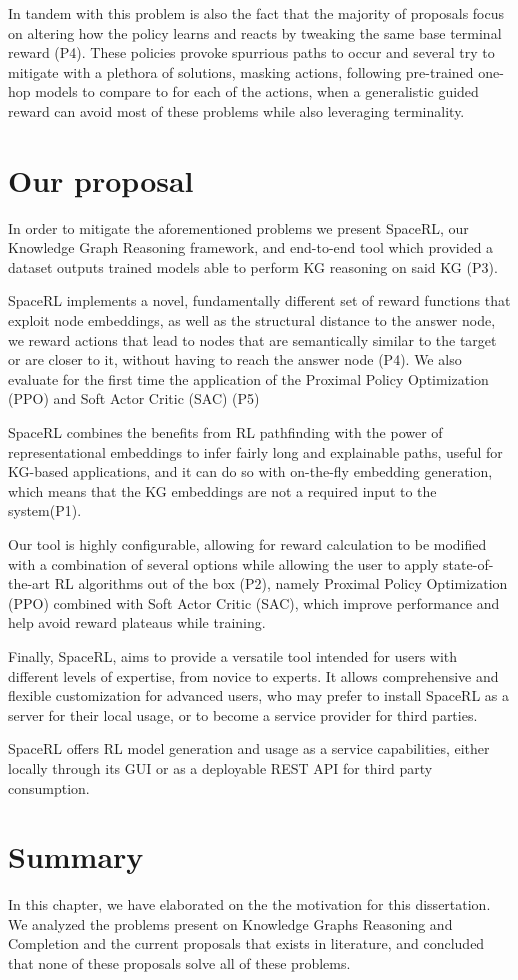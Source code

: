 In tandem with this problem is also the fact that the majority of proposals focus on altering how the policy learns and reacts by tweaking the same base terminal reward (P4). These policies provoke spurrious paths to occur and several \cite{} try to mitigate with a plethora of solutions, masking actions, following pre-trained one-hop models to compare to for each of the actions, when a generalistic guided reward can avoid most of these problems while also leveraging terminality.

\section{Our proposal}\label{sec:moti-proposal}
In order to mitigate the aforementioned problems we present SpaceRL, our Knowledge Graph Reasoning framework, and end-to-end tool which provided a dataset outputs trained models able to perform KG reasoning on said KG (P3).

SpaceRL implements a novel, fundamentally different set of reward functions that exploit node embeddings, as well as the structural distance to the answer node, we reward actions that lead to nodes that are semantically similar to the target or are closer to it, without having to reach the answer node (P4). We also evaluate for the first time the application of the Proximal Policy Optimization (PPO) and Soft Actor Critic (SAC) (P5)

SpaceRL combines the benefits from RL pathfinding with the power of representational embeddings to infer fairly long and explainable paths, useful for KG-based applications, and it can do so with on-the-fly embedding generation, which means that the KG embeddings are not a required input to the system(P1).

Our tool is highly configurable, allowing for reward calculation to be modified with a combination of several options while allowing the user to apply state-of-the-art RL algorithms out of the box (P2), namely Proximal Policy Optimization (PPO)\cite{schulman2017proximal} combined with Soft Actor Critic (SAC)\cite{haarnoja2018soft}, which improve performance and help avoid reward plateaus while training.

Finally, SpaceRL, aims to provide a versatile tool intended for users with different levels of expertise, from novice to experts. It allows comprehensive and flexible customization for advanced users, who may prefer to install SpaceRL as a server for their local usage, or to become a service provider for third parties.

SpaceRL offers RL model generation and usage as a service capabilities, either locally through its GUI or as a deployable REST API for third party consumption. 

\section{Summary}\label{sec:moti-summary}
In this chapter, we have elaborated on the the motivation for this dissertation. We analyzed the problems present on Knowledge Graphs Reasoning and Completion and the current proposals that exists in literature, and concluded that none of these proposals solve all of these problems.